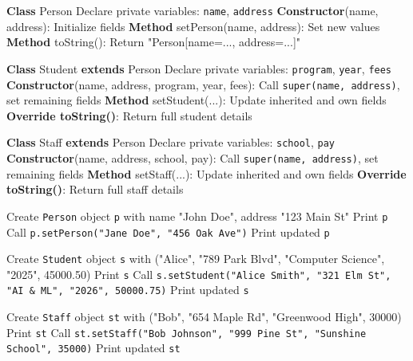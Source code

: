 \begin{algorithm}[H]
\caption{Class \texttt{Person}, \texttt{Student}, and \texttt{Staff} Structure}
\begin{algorithmic}[1]
\STATE \textbf{Class} Person
\STATE \quad Declare private variables: \texttt{name}, \texttt{address}
\STATE \quad \textbf{Constructor}(name, address): Initialize fields
\STATE \quad \textbf{Method} setPerson(name, address): Set new values
\STATE \quad \textbf{Method} toString(): Return "Person[name=..., address=...]"

\STATE \textbf{Class} Student \textbf{extends} Person
\STATE \quad Declare private variables: \texttt{program}, \texttt{year}, \texttt{fees}
\STATE \quad \textbf{Constructor}(name, address, program, year, fees): 
\STATE \quad \quad Call \texttt{super(name, address)}, set remaining fields
\STATE \quad \textbf{Method} setStudent(...): Update inherited and own fields
\STATE \quad \textbf{Override toString()}: Return full student details

\STATE \textbf{Class} Staff \textbf{extends} Person
\STATE \quad Declare private variables: \texttt{school}, \texttt{pay}
\STATE \quad \textbf{Constructor}(name, address, school, pay): 
\STATE \quad \quad Call \texttt{super(name, address)}, set remaining fields
\STATE \quad \textbf{Method} setStaff(...): Update inherited and own fields
\STATE \quad \textbf{Override toString()}: Return full staff details
\end{algorithmic}
\end{algorithm}

\begin{algorithm}[H]
\caption{Test Program for \texttt{Person}, \texttt{Student}, and \texttt{Staff}}
\begin{algorithmic}[1]
\STATE Create \texttt{Person} object \texttt{p} with name "John Doe", address "123 Main St"
\STATE Print \texttt{p}
\STATE Call \texttt{p.setPerson("Jane Doe", "456 Oak Ave")}
\STATE Print updated \texttt{p}

\STATE Create \texttt{Student} object \texttt{s} with ("Alice", "789 Park Blvd", "Computer Science", "2025", 45000.50)
\STATE Print \texttt{s}
\STATE Call \texttt{s.setStudent("Alice Smith", "321 Elm St", "AI \& ML", "2026", 50000.75)}
\STATE Print updated \texttt{s}

\STATE Create \texttt{Staff} object \texttt{st} with ("Bob", "654 Maple Rd", "Greenwood High", 30000)
\STATE Print \texttt{st}
\STATE Call \texttt{st.setStaff("Bob Johnson", "999 Pine St", "Sunshine School", 35000)}
\STATE Print updated \texttt{st}
\end{algorithmic}
\end{algorithm}